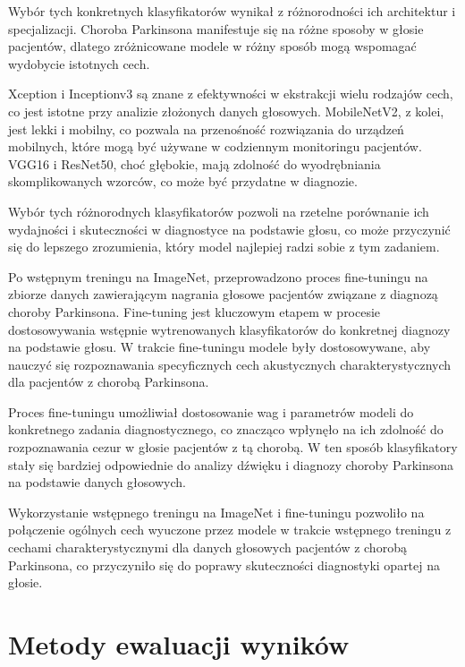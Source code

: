 Wybór tych konkretnych klasyfikatorów wynikał z różnorodności ich architektur i specjalizacji.
Choroba Parkinsona manifestuje się na różne sposoby w głosie pacjentów, dlatego zróżnicowane modele w różny sposób mogą wspomagać wydobycie istotnych cech.

Xception i Inceptionv3 są znane z efektywności w ekstrakcji wielu rodzajów cech, co jest istotne przy analizie złożonych danych głosowych.
MobileNetV2, z kolei, jest lekki i mobilny, co pozwala na przenośność rozwiązania do urządzeń mobilnych, które mogą być używane w codziennym monitoringu pacjentów.
VGG16 i ResNet50, choć głębokie, mają zdolność do wyodrębniania skomplikowanych wzorców, co może być przydatne w diagnozie.

Wybór tych różnorodnych klasyfikatorów pozwoli na rzetelne porównanie ich wydajności i skuteczności w diagnostyce na podstawie głosu, co może przyczynić się do lepszego zrozumienia, który model najlepiej radzi sobie z tym zadaniem.

Po wstępnym treningu na ImageNet, przeprowadzono proces fine-tuningu na zbiorze danych zawierającym nagrania głosowe pacjentów związane z diagnozą choroby Parkinsona.
Fine-tuning jest kluczowym etapem w procesie dostosowywania wstępnie wytrenowanych klasyfikatorów do konkretnej diagnozy na podstawie głosu.
W trakcie fine-tuningu modele były dostosowywane, aby nauczyć się rozpoznawania specyficznych cech akustycznych charakterystycznych dla pacjentów z chorobą Parkinsona.

Proces fine-tuningu umożliwiał dostosowanie wag i parametrów modeli do konkretnego zadania diagnostycznego, co znacząco wpłynęło na ich zdolność do rozpoznawania cezur w głosie pacjentów z tą chorobą.
W ten sposób klasyfikatory stały się bardziej odpowiednie do analizy dźwięku i diagnozy choroby Parkinsona na podstawie danych głosowych.

Wykorzystanie wstępnego treningu na ImageNet i fine-tuningu pozwoliło na połączenie ogólnych cech wyuczone przez modele w trakcie wstępnego treningu z cechami charakterystycznymi dla danych głosowych pacjentów z chorobą Parkinsona, co przyczyniło się do poprawy skuteczności diagnostyki opartej na głosie.

\section{Metody ewaluacji wyników}
\label{sec:metody-ewaluacji-wynikow}

